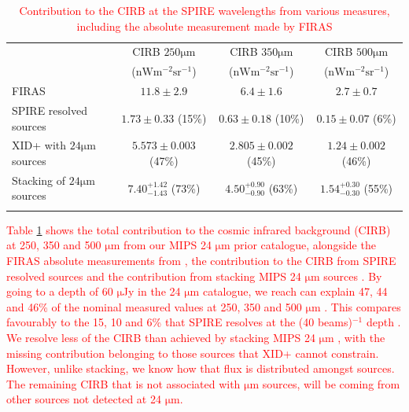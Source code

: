 \documentclass[useAMS,usenatbib]{mnras}
\begin{document}
\begin{table}
\begin{tabular}{ | l || c || c || c ||}
\rowcolor{red}
\hline
\rowcolor{red}
& CIRB $250 \mathrm{\mu m}$ & CIRB $350 \mathrm{\mu m}$ & CIRB $500 \mathrm{\mu m}$ \\
\rowcolor{red}
& ($\mathrm{nWm^{-2}sr^{-1}}$) & ($\mathrm{nWm^{-2}sr^{-1}}$) & ($\mathrm{nWm^{-2}sr^{-1}}$) \\
\rowcolor{red}
\hline
\rowcolor{red}
FIRAS \citep{Lagache:2000}& $11.8\pm2.9$ & $6.4\pm1.6$ & $2.7\pm0.7$ \\
\rowcolor{red}
\hline
\rowcolor{red}
SPIRE resolved sources \citep{Oliver:2010}& $1.73\pm0.33$ (15\%)& $0.63\pm0.18$ (10\%)& $0.15\pm0.07$ (6\%)\\
\rowcolor{red}
\hline
\rowcolor{red}
XID+ with $24 \mathrm{\mu m}$ sources& $5.573\pm0.003$ (47\%)& $2.805\pm0.002$ (45\%)& $1.24\pm0.002$ (46\%)\\
\rowcolor{red}
\hline
\rowcolor{red}
Stacking of $24 \mathrm{\mu m}$ sources \citep{Bethermin:2012}& $7.40^{+1.42}_{-1.43}$ (73\%)& $4.50^{+0.90}_{-0.90}$ (63\%)& $1.54^{+0.30}_{-0.30}$ (55\%)\\
\rowcolor{red}
\hline
\end{tabular}
\caption{\textcolor{red}{Contribution to the CIRB at the SPIRE wavelengths from various measures, including the absolute measurement made by FIRAS}}\label{tab:cirb}
\end{table}


\textcolor{red}{Table \ref{tab:cirb} shows the total contribution to the cosmic infrared background (CIRB) at 250, 350 and 500 $\mathrm{\mu m}$ from our MIPS 24 $\mathrm{\mu m}$ prior catalogue, alongside the FIRAS absolute measurements from \cite{Lagache:2000}, the contribution to the CIRB from SPIRE resolved sources \citep{Oliver:2010} and the contribution from stacking MIPS 24 $\mathrm{\mu m}$ sources \citep{Bethermin:2012}. By going to a depth of 60 $\mathrm{\mu}$Jy in the 24 $\mathrm{\mu m}$ catalogue, we reach can explain 47, 44 and 46\% of the nominal measured values at 250, 350 and 500 $\mathrm{\mu m}$ \citep{Lagache:2000}. This compares favourably to the 15, 10 and 6\% that SPIRE resolves at the (40 beams)$^{-1}$ depth \citep{Oliver:2010}. We resolve less of the CIRB than achieved by stacking MIPS 24 $\mathrm{\mu m}$ , with the missing contribution belonging to those sources that \textsc{XID+} cannot constrain. However, unlike stacking, we know how that flux is distributed amongst sources. The remaining  CIRB that is not associated with $\mathrm{\mu m}$ sources, will be coming from other sources not detected at 24 $\mathrm{\mu m}$.}
\end{document}
